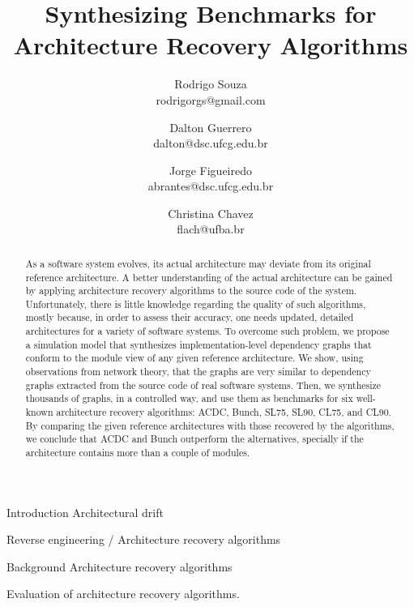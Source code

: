 \documentclass[11pt,twocolumn,a4paper,english]{article}
\title{
Synthesizing Benchmarks for Architecture Recovery Algorithms}
\author{Rodrigo Souza \\ rodrigorgs@gmail.com 
\and Dalton Guerrero \\ dalton@dsc.ufcg.edu.br
\and Jorge Figueiredo \\ abrantes@dsc.ufcg.edu.br
\and Christina Chavez \\ flach@ufba.br
}
\begin{document}
\sloppy
\maketitle

\begin{abstract}
	As a software system evolves, its actual architecture may deviate from its original reference architecture. A better understanding of the actual architecture can be gained by applying architecture recovery algorithms to the source code of the system. Unfortunately, there is little knowledge regarding the quality of such algorithms, mostly because, in order to assess their accuracy, one needs updated, detailed architectures for a variety of software systems.
	To overcome such problem, we propose a simulation model that synthesizes implementation-level dependency graphs that conform to the module view of any given reference architecture. We show, using observations from network theory, that the graphs are very similar to dependency graphs extracted from the source code of real software systems. 
	Then, we synthesize thousands of graphs, in a controlled way, and use them as benchmarks for six well-known architecture recovery algorithms: ACDC, Bunch, SL75, SL90, CL75, and CL90. By comparing the given reference architectures with those recovered by the algorithms, we conclude that ACDC and Bunch outperform the alternatives, specially if the architecture contains more than a couple of modules.\end{abstract}


\begin{section}{Introduction}
	Architectural drift

	Reverse engineering / Architecture recovery algorithms
	
\end{section}


\begin{section}{Background}
	Architecture recovery algorithms

	Evaluation of architecture recovery algorithms. 
	
\end{section}
\end{document}

